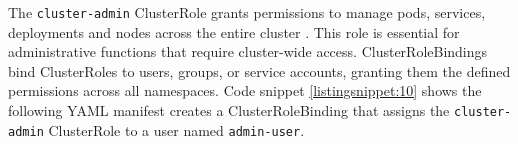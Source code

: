 
The \texttt{cluster-admin} ClusterRole grants permissions to manage pods, services, deployments and nodes across the entire cluster . This role is essential for administrative functions that require cluster-wide access. ClusterRoleBindings bind ClusterRoles to users, groups, or service accounts, granting them the defined permissions across all namespaces. Code snippet \autoref{listingsnippet:10} shows the following YAML manifest creates a ClusterRoleBinding that assigns the \texttt{cluster-admin} ClusterRole to a user named \texttt{admin-user}. \cite{Kubernetes_doc}

